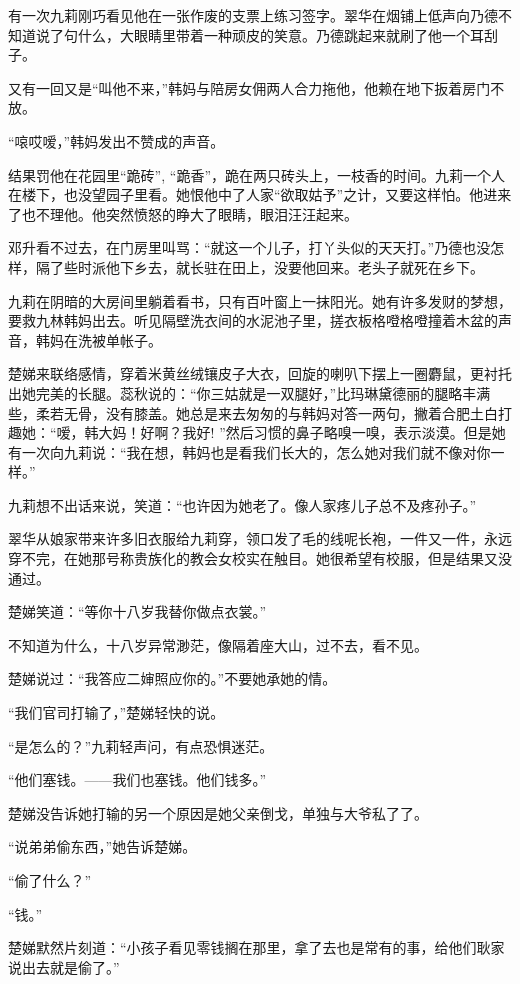 \par 有一次九莉刚巧看见他在一张作废的支票上练习签字。翠华在烟铺上低声向乃德不知道说了句什么，大眼睛里带着一种顽皮的笑意。乃德跳起来就刷了他一个耳刮子。
\par 又有一回又是“叫他不来，”韩妈与陪房女佣两人合力拖他，他赖在地下扳着房门不放。
\par “㗒哎嗳，”韩妈发出不赞成的声音。
\par 结果罚他在花园里“跪砖”, “跪香”，跪在两只砖头上，一枝香的时间。九莉一个人在楼下，也没望园子里看。她恨他中了人家“欲取姑予”之计，又要这样怕。他进来了也不理他。他突然愤怒的睁大了眼睛，眼泪汪汪起来。
\par 邓升看不过去，在门房里叫骂：“就这一个儿子，打丫头似的天天打。”乃德也没怎样，隔了些时派他下乡去，就长驻在田上，没要他回来。老头子就死在乡下。
\par 九莉在阴暗的大房间里躺着看书，只有百叶窗上一抹阳光。她有许多发财的梦想，要救九林韩妈出去。听见隔壁洗衣间的水泥池子里，搓衣板格噔格噔撞着木盆的声音，韩妈在洗被单帐子。
\par 楚娣来联络感情，穿着米黄丝绒镶皮子大衣，回旋的喇叭下摆上一圈麝鼠，更衬托出她完美的长腿。蕊秋说的：“你三姑就是一双腿好，”比玛琳黛德丽的腿略丰满些，柔若无骨，没有膝盖。她总是来去匆匆的与韩妈对答一两句，撇着合肥土白打趣她：“嗳，韩大妈！好啊？我好! ”然后习惯的鼻子略嗅一嗅，表示淡漠。但是她有一次向九莉说：“我在想，韩妈也是看我们长大的，怎么她对我们就不像对你一样。”
\par 九莉想不出话来说，笑道：“也许因为她老了。像人家疼儿子总不及疼孙子。”
\par 翠华从娘家带来许多旧衣服给九莉穿，领口发了毛的线呢长袍，一件又一件，永远穿不完，在她那号称贵族化的教会女校实在触目。她很希望有校服，但是结果又没通过。
\par 楚娣笑道：“等你十八岁我替你做点衣裳。”
\par 不知道为什么，十八岁异常渺茫，像隔着座大山，过不去，看不见。
\par 楚娣说过：“我答应二婶照应你的。”不要她承她的情。
\par “我们官司打输了，”楚娣轻快的说。
\par “是怎么的？”九莉轻声问，有点恐惧迷茫。
\par “他们塞钱。——我们也塞钱。他们钱多。”
\par 楚娣没告诉她打输的另一个原因是她父亲倒戈，单独与大爷私了了。
\par “说弟弟偷东西，”她告诉楚娣。
\par “偷了什么？”
\par “钱。”
\par 楚娣默然片刻道：“小孩子看见零钱搁在那里，拿了去也是常有的事，给他们耿家说出去就是偷了。”
